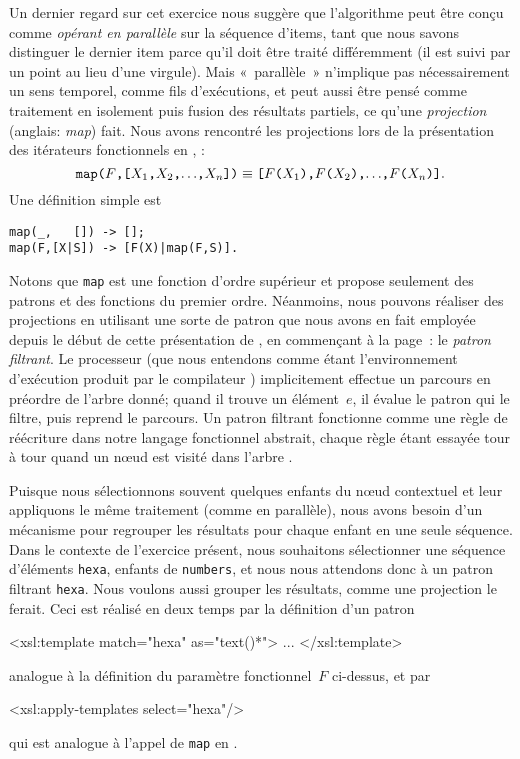 Un dernier regard sur cet exercice nous suggère que l'algorithme peut
être conçu comme \emph{opérant en parallèle} sur la séquence d'items,
tant que nous savons distinguer le dernier item parce qu'il doit être
traité différemment (il est suivi par un point au lieu d'une
virgule). Mais «~parallèle~» n'implique pas nécessairement un sens
temporel, comme fils d'exécutions, et peut aussi être pensé comme
traitement en isolement puis fusion des résultats partiels, ce qu'une
\emph{projection} (anglais: \emph{map}) fait. Nous avons rencontré les
projections lors de la présentation des itérateurs fonctionnels en
\Erlang, :
\begin{equation*}
\texttt{map(\(F\),[\(X_1\),\(X_2\),\(\ldots\),\(X_{n}\)])}
\equiv
\texttt{[\(F\)(\(X_1\)),\(F\)(\(X_2\)),\(\ldots\),\(F\)(\(X_{n}\))]}.
\end{equation*}
Une définition simple est
\begin{verbatim}
map(_,   []) -> [];
map(F,[X|S]) -> [F(X)|map(F,S)].
\end{verbatim}
Notons que \texttt{map} est une fonction d'ordre supérieur et \XSLT
propose seulement des patrons et des fonctions du premier
ordre. Néanmoins, nous pouvons réaliser des projections en utilisant
une sorte de patron que nous avons en fait employée depuis le début de
cette présentation de \XSLT, en commençant à la
page~\pageref{par:matching}: le \emph{patron filtrant}. Le processeur
\XSLT (que nous entendons comme étant l'environnement d'exécution
produit par le compilateur \XSLT) implicitement effectue un parcours
en préordre de l'arbre \XML donné; quand il trouve un élément~\(e\),
il évalue le patron qui le filtre, puis reprend le parcours. Un patron
filtrant fonctionne comme une règle de réécriture dans notre langage
fonctionnel abstrait, chaque règle étant essayée tour à tour quand un
nœud est visité dans l'arbre \XML.

Puisque nous sélectionnons souvent quelques enfants du nœud
contextuel et leur appliquons le même traitement (comme en parallèle),
nous avons besoin d'un mécanisme pour regrouper les résultats pour
chaque enfant en une seule séquence. Dans le contexte de l'exercice
présent, nous souhaitons sélectionner une séquence d'éléments
\texttt{hexa}, enfants de \texttt{numbers}, et nous nous attendons
donc à un patron filtrant \texttt{hexa}. Nous voulons aussi grouper
les résultats, comme une projection le ferait. Ceci est réalisé en
deux temps par la définition d'un patron
\begin{sverb}
  <xsl:template match="hexa" as="text()*">
    ...
  </xsl:template>
\end{sverb}
analogue à la définition du paramètre fonctionnel~\(F\) ci-dessus, et
par
\begin{sverb}
    <xsl:apply-templates select="hexa"/>
\end{sverb}
qui est analogue à l'appel de \texttt{map} en
\Erlang.\label{match_as_map}

